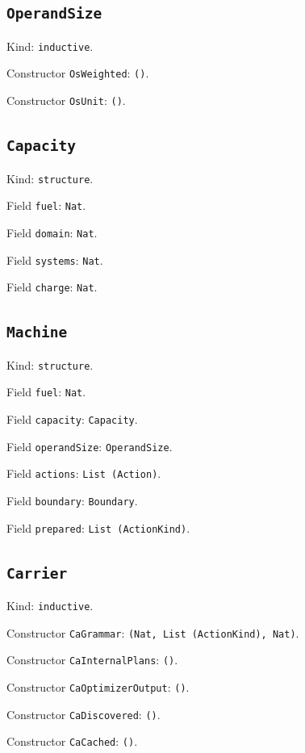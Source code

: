 \documentclass[11pt]{article}
\begin{document}
\subsection*{\texttt{OperandSize}}
\noindent Kind: \texttt{inductive}.\par
\noindent Constructor \texttt{OsWeighted}: \texttt{()}.\par
\noindent Constructor \texttt{OsUnit}: \texttt{()}.\par
\subsection*{\texttt{Capacity}}
\noindent Kind: \texttt{structure}.\par
\noindent Field \texttt{fuel}: \texttt{Nat}.\par
\noindent Field \texttt{domain}: \texttt{Nat}.\par
\noindent Field \texttt{systems}: \texttt{Nat}.\par
\noindent Field \texttt{charge}: \texttt{Nat}.\par
\subsection*{\texttt{Machine}}
\noindent Kind: \texttt{structure}.\par
\noindent Field \texttt{fuel}: \texttt{Nat}.\par
\noindent Field \texttt{capacity}: \texttt{Capacity}.\par
\noindent Field \texttt{operandSize}: \texttt{OperandSize}.\par
\noindent Field \texttt{actions}: \texttt{List (Action)}.\par
\noindent Field \texttt{boundary}: \texttt{Boundary}.\par
\noindent Field \texttt{prepared}: \texttt{List (ActionKind)}.\par
\subsection*{\texttt{Carrier}}
\noindent Kind: \texttt{inductive}.\par
\noindent Constructor \texttt{CaGrammar}: \texttt{(Nat, List (ActionKind), Nat)}.\par
\noindent Constructor \texttt{CaInternalPlans}: \texttt{()}.\par
\noindent Constructor \texttt{CaOptimizerOutput}: \texttt{()}.\par
\noindent Constructor \texttt{CaDiscovered}: \texttt{()}.\par
\noindent Constructor \texttt{CaCached}: \texttt{()}.\par
\end{document}
